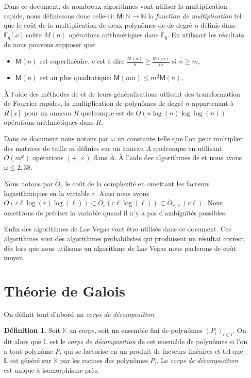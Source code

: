 \documentclass[10pt,a4paper]{book}
\theoremstyle{plain}
\theoremstyle{definition}
\theoremstyle{definition}
\theoremstyle{definition}
\theoremstyle{definition}
\theoremstyle{definition}
\newtheorem{defi}[thm]{Définition}
\theoremstyle{remark}
\theoremstyle{remark}
\theoremstyle{definition}
\begin{document}
Dans ce document, de nombreux algorithmes vont utiliser la multiplication rapide, nous définissons donc celle-ci: $\mathsf{M}:\mathbb{N} \rightarrow \mathbb{N}$ la \emph{fonction de multiplication} tel que le coût de la multiplication de deux polynômes de de degré $n$ définis dans $\mathbb{F}_q[x]$ coûte $M(n)$ opérations arithmétiques dans $\mathbb{F}_q$. En utilisant les résultats de \cite[§8.3]{vzGJG03} nous pouvons supposer que:
\begin{itemize}
\item $\mathsf{M}(n)$ est superlinéaire, c'est à dire $\frac{\mathsf{M}(n)}{n} \geqslant \frac{\mathsf{M}(m)}{m}$ si $n \geqslant m$,
\item $\mathsf{M}(n)$ est au plus quadratique: $\mathsf{M}(mn) \leqslant m^2 \mathsf{M}(n)$.
\end{itemize} 

\`A l'aide des méthodes de \cite{SchonhageStrassen71} et de leurs généralisations  \cite{Schonhage77} \cite{Cantor-Kaltofen91} utlisant des transformation de Fourrier rapides, la multiplication de polynômes de degré $n$ appartenant à $R[x]$ pour un anneau $R$ quelconque est de \newline ${O(n\log(n) \log \log (n))}$ opérations arithmétiques dans $R$.


Dans ce document nous notons par $\omega$ un constante telle que l'on peut 
multiplier des matrices de taille $m$ définies sur un anneau $A$ quelconque en
utilisant $O(m^{\omega})$ opérations $(+,\times)$ dans $A$. \`A l'aide des 
algorithmes de \cite{CoppersmithWinograd90} et \cite{Williams12} nous avons
 $\omega \leqslant 2,38$.

Nous notons par $\tilde{O}_{r}$ le coût de la complexité en omettant les facteurs 
logarithmiques en la variable $r$. Ainsi nous avons $O(r \ell \log(r) \log(\ell)) 
\subset \tilde{O}_{r}(r \ell \log(\ell)) \subset \tilde{O}_{r,\ell}(r \ell)$. 
Nous omettrons de préciser la variable quand il n'y a pas d'ambiguïtés possibles.

Enfin des algorithmes de Las Vegas vont être utilisés dans ce document. Ces algorithmes sont des algorithmes probabilistes qui produisent un résultat correct, dès lors que nous utilisons un algorithme de Las Vegas nous parlerons de coût moyen. 


\section{Théorie de Galois}

On définit tout d'abord un \emph{corps de décomposition}.
\begin{defi}
Soit $\mathbb{K}$ un corps, soit un ensemble fini de polynômes 
$(P_i)_{i \in I}$. On dit alors que $\mathbb{L}$ est le 
\emph{corps de décomposition} de cet ensemble de polynômes si l'on a tout polynôme
 $P_i$ qui se factorise en un produit de facteurs linéaires et tel que 
 $\mathbb{L}$ est généré sur $\mathbb{K}$ par les racines des polynômes $P_i$.
 Le \emph{corps de décomposition} est unique à isomorphisme près. 
\end{defi}
\end{document}
